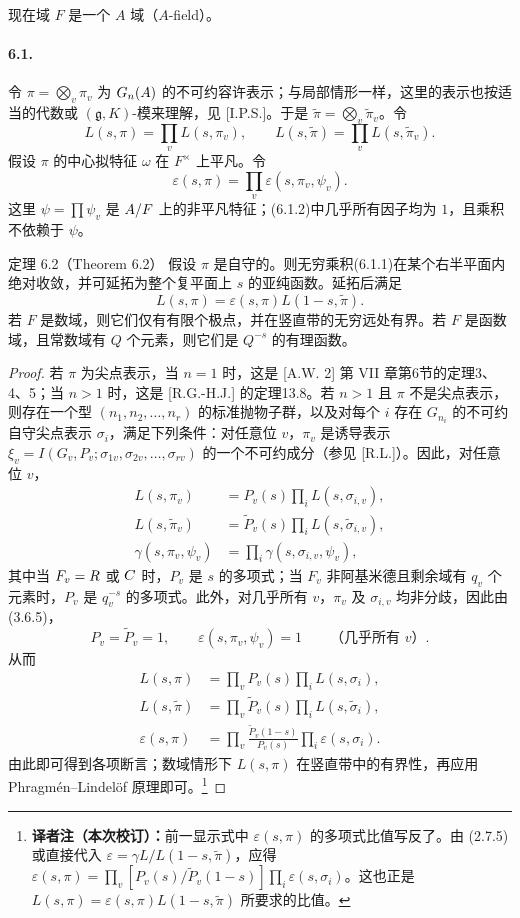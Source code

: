 现在域 $F$ 是一个 $A$ 域（$A$-field）。
\paragraph*{6.1.}
令 $\pi=\bigotimes_v\pi_v$ 为 $G_n(A)$ 的不可约容许表示；与局部情形一样，这里的表示也按适当的代数或 $(\mathfrak g,K)$-模来理解，见 [I.P.S.]。于是 $\widetilde\pi=\bigotimes_v\widetilde\pi_v$。令
\[
 L(s,\pi)=\prod_vL(s,\pi_v),\qquad
 L(s,\widetilde\pi)=\prod_vL(s,\widetilde\pi_v).\tag{6.1.1}
\]
假设 $\pi$ 的中心拟特征 $\omega$ 在 $F^\times$ 上平凡。令
\[
 \varepsilon(s,\pi)=\prod_v\varepsilon(s,\pi_v,\psi_v).\tag{6.1.2}
\]
这里 $\psi=\prod\psi_v$ 是 $A/F$ 上的非平凡特征；(6.1.2)中几乎所有因子均为 $1$，且乘积不依赖于 $\psi$。

\begin{originaltheorem}{定理 6.2（Theorem 6.2）}
假设 $\pi$ 是自守的。则无穷乘积(6.1.1)在某个右半平面内绝对收敛，并可延拓为整个复平面上 $s$ 的亚纯函数。延拓后满足
\[
 L(s,\pi)=\varepsilon(s,\pi)L(1-s,\widetilde\pi).
\]
若 $F$ 是数域，则它们仅有有限个极点，并在竖直带的无穷远处有界。若 $F$ 是函数域，且常数域有 $Q$ 个元素，则它们是 $Q^{-s}$ 的有理函数。
\end{originaltheorem}
\begin{proof}
若 $\pi$ 为尖点表示，当 $n=1$ 时，这是 [A.W. 2] 第 VII 章第6节的定理3、4、5；当 $n>1$ 时，这是 [R.G.-H.J.] 的定理13.8。若 $n>1$ 且 $\pi$ 不是尖点表示，则存在一个型 $(n_1,n_2,\ldots,n_r)$ 的标准抛物子群，以及对每个 $i$ 存在 $G_{n_i}$ 的不可约自守尖点表示 $\sigma_i$，满足下列条件：对任意位 $v$，$\pi_v$ 是诱导表示 $\xi_v=I(G_v,P_v;\sigma_{1v},\sigma_{2v},\ldots,\sigma_{rv})$ 的一个不可约成分（参见 [R.L.]）。因此，对任意位 $v$，
\[
\begin{split}
 L(s,\pi_v)&=P_v(s)\prod_iL(s,\sigma_{i,v}),\\
 L(s,\widetilde\pi_v)&=\widetilde P_v(s)\prod_iL(s,\widetilde\sigma_{i,v}),\\
 \gamma(s,\pi_v,\psi_v)&=\prod_i\gamma(s,\sigma_{i,v},\psi_v),
\end{split}
\]
其中当 $F_v=R$ 或 $C$ 时，$P_v$ 是 $s$ 的多项式；当 $F_v$ 非阿基米德且剩余域有 $q_v$ 个元素时，$P_v$ 是 $q_v^{-s}$ 的多项式。此外，对几乎所有 $v$，$\pi_v$ 及 $\sigma_{i,v}$ 均非分歧，因此由(3.6.5)，
\[
 P_v=\widetilde P_v=1,\qquad\varepsilon(s,\pi_v,\psi_v)=1
 \qquad\text{（几乎所有 }v\text{）}.
\]
从而
\[
\begin{split}
 L(s,\pi)&=\prod_vP_v(s)\prod_iL(s,\sigma_i),\\
 L(s,\widetilde\pi)&=\prod_v\widetilde P_v(s)\prod_iL(s,\widetilde\sigma_i),\\
 \varepsilon(s,\pi)&=\prod_v\frac{\widetilde P_v(1-s)}{P_v(s)}
 \prod_i\varepsilon(s,\sigma_i).
\end{split}
\]
由此即可得到各项断言；数域情形下 $L(s,\pi)$ 在竖直带中的有界性，再应用 Phragmén--Lindelöf 原理即可。\footnote{\textbf{译者注（本次校订）：}前一显示式中 $\varepsilon(s,\pi)$ 的多项式比值写反了。由 (2.7.5) 或直接代入 $\varepsilon=\gamma L/L(1-s,\widetilde\pi)$，应得 $\varepsilon(s,\pi)=\prod_v[P_v(s)/\widetilde P_v(1-s)]\prod_i\varepsilon(s,\sigma_i)$。这也正是 $L(s,\pi)=\varepsilon(s,\pi)L(1-s,\widetilde\pi)$ 所要求的比值。}
\end{proof}

